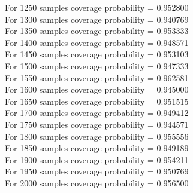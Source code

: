 \documentclass{article}
\begin{document}
For 1250 samples coverage probability = 0.952800\\
For 1300 samples coverage probability = 0.940769\\
For 1350 samples coverage probability = 0.953333\\
For 1400 samples coverage probability = 0.948571\\
For 1450 samples coverage probability = 0.953103\\
For 1500 samples coverage probability = 0.947333\\
For 1550 samples coverage probability = 0.962581\\
For 1600 samples coverage probability = 0.945000\\
For 1650 samples coverage probability = 0.951515\\
For 1700 samples coverage probability = 0.949412\\
For 1750 samples coverage probability = 0.944571\\
For 1800 samples coverage probability = 0.955556\\
For 1850 samples coverage probability = 0.949189\\
For 1900 samples coverage probability = 0.954211\\
For 1950 samples coverage probability = 0.950769\\
For 2000 samples coverage probability = 0.956500\\
\end{document}
